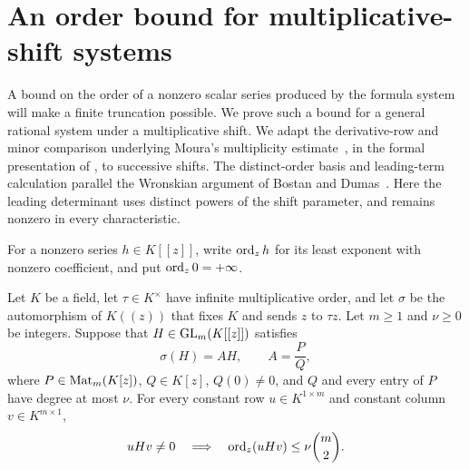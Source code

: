 \section{An order bound for multiplicative-shift systems}
\label{sec:order}

A bound on the order of a nonzero scalar series produced by the formula
system will make a finite truncation possible.  We prove such a bound for
a general rational system under a multiplicative shift.  We adapt the
derivative-row and minor comparison underlying Moura's multiplicity
estimate~\cite{Moura2003}, in the formal presentation of
\cite[Section~4, Theorem~4.2]{OAInc}, to successive shifts.
The distinct-order basis and leading-term calculation parallel the
Wronskian argument of Bostan and Dumas~\cite[Lemmas~1--3]{BostanDumas2010}.
Here the leading determinant uses distinct powers of the shift parameter,
and remains nonzero in every characteristic.

For a nonzero series $h\in K[[z]]$, write $\operatorname{ord}_z h$ for its least exponent
with nonzero coefficient, and put $\operatorname{ord}_z 0=+\infty$.

\begin{theorem}\label{thm:order}
Let $K$ be a field, let $\tau\in K^\times$ have infinite multiplicative
order, and let $\sigma$ be the automorphism of $K((z))$ that fixes $K$ and
sends $z$ to $\tau z$.  Let $m\geq 1$ and $\nu\geq 0$ be integers.
Suppose that $H\in\operatorname{GL}_m(K[[z]])$ satisfies
\begin{equation}\label{eq:order-system}
  \sigma(H)=A H,\qquad A=\frac{P}{Q},
\end{equation}
where $P\in\operatorname{Mat}_m(K[z])$, $Q\in K[z]$, $Q(0)\neq 0$, and $Q$ and every
entry of $P$ have degree at most $\nu$.  For every constant row
$u\in K^{1\times m}$ and constant column $v\in K^{m\times 1}$,
\begin{equation}\label{eq:order-bound}
  uHv\neq 0
  \quad\Longrightarrow\quad
  \operatorname{ord}_z(uHv)\leq \nu\binom{m}{2}.
\end{equation}
\end{theorem}

